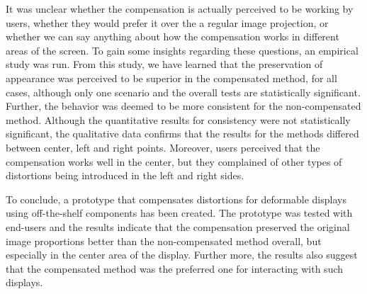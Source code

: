 \documentclass[]{article}
\begin{document}
It was unclear whether the compensation is actually perceived to be working by users, whether they would prefer it over the a regular image projection, or whether we can say anything about how the compensation works in different areas of the screen. To gain some insights regarding these questions, an empirical study was run. From this study, we have learned that the preservation of appearance was perceived to be superior in the compensated method, for all cases, although only one scenario and the overall tests are statistically significant. Further, the behavior was deemed to be more consistent for the non-compensated method. Although the quantitative results for consistency were not statistically significant, the qualitative data confirms that the results for the methods differed between center, left and right points. Moreover, users perceived that the compensation works well in the center, but they complained of other types of distortions being introduced in the left and right sides.

To conclude, a prototype that compensates distortions for deformable displays using off-the-shelf components has been created. The prototype was tested with end-users and the results indicate that the compensation preserved the original image proportions better than the non-compensated method overall, but especially in the center area of the display. Further more, the results also suggest that the compensated method was the preferred one for interacting with such displays.

\newpage



\newpage
\end{document}
